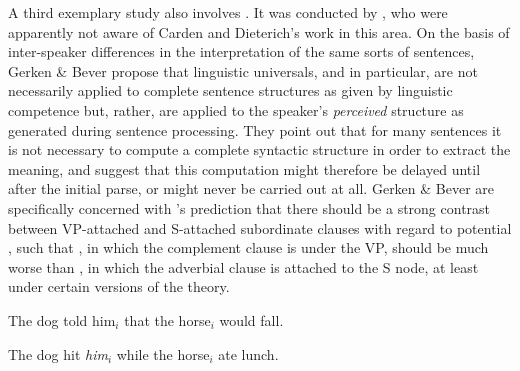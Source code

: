 A third exemplary study also involves . It was conducted by \citet{GerkenEtAl1986}, who were apparently not aware of Carden
and Dieterich's work in this area. On the basis of inter-speaker differences in the interpretation of the same sorts of sentences, Gerken \& Bever propose that linguistic universals, and  in particular, are not necessarily applied to complete sentence structures as given by linguistic competence but, rather, are applied to the speaker's \textit{perceived} structure as generated during sentence processing. They point out that for many sentences it is not necessary to compute a complete syntactic structure in order to extract the meaning, and suggest that this computation might therefore be delayed until after the initial parse, or might never be carried out at all. Gerken \& Bever are specifically concerned with 's prediction that there should be a strong contrast between VP-attached and S-attached subordinate clauses with regard to potential , such that , in which the complement clause is under the VP, should be much worse than , in which the adverbial clause is attached to the S node, at least under certain versions of the theory.


\ea\label{ex:1:4}
The dog told him$_i$ that the horse$_i$ would fall.
\z


\ea\label{ex:1:5}
The dog hit \textit{him$_i$} while the horse$_i$ ate lunch.
\z

